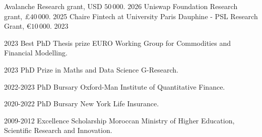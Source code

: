 \begin{center}
\end{center}



\vspace{-1mm}

\begin{cvhonors}

    \cvhonor
    {Avalanche}
    {Research grant, USD $50\,000$.}
    {}
    {2026}
    \cvhonor
    {Uniswap Foundation}
    {Research grant, £$40\,000$.} %
    {}
    {2025}
    \cvhonor
    {Chaire Fintech at University Paris Dauphine - PSL} %
    {Research Grant, \euro$10\,000$.} %
    {} %
    {2023} %
\end{cvhonors}

\vspace{0mm}
\par\noindent
\begin{minipage}[t]{\linewidth}
\par\vspace{1mm}


\begin{cvskills}

    \cvskill
    {2023}
    {Best PhD Thesis prize}
    {EURO Working Group for Commodities and Financial Modelling.} %

    \cvskill
    {2023}
    {PhD Prize in Maths and Data Science}
    {G-Research.} %

    \cvskill
    {2022-2023}
    {PhD Bursary}
    {Oxford-Man Institute of Quantitative Finance.} %

    \cvskill
    {2020-2022}
    {PhD Bursary} 
    {New York Life Insurance.}


    \cvskill
    {2009-2012} 
    {Excellence Scholarship} 
    {Moroccan Ministry of Higher Education, Scientific Research and Innovation.} %


\end{cvskills}
\end{minipage}
\par

